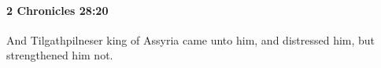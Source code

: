 
		\paragraph{2 Chronicles 28:20} %
			\label{2CHRONICLES-28-20}

			And Tilgathpilneser king of Assyria came unto him, and distressed him, but strengthened him not.


